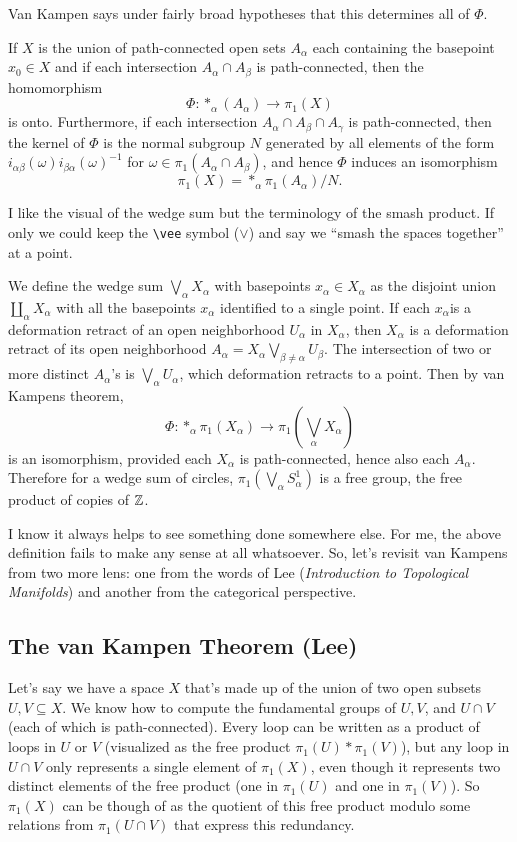 Van Kampen says under fairly broad hypotheses that this determines all of $\Phi$.

\begin{theorem}
    If $X$ is the union of path-connected open sets $A_{\alpha}$ each containing the basepoint $x_0\in X$ and if each intersection $A_{\alpha}\cap A_{\beta}$ is path-connected, then the homomorphism \[
        \Phi \colon *_{\alpha}(A_{\alpha}) \to \pi_1(X)
    \] is onto. Furthermore, if each intersection $A_{\alpha}\cap A_{\beta}\cap A_{\gamma}$ is path-connected, then the kernel of $\Phi$ is the normal subgroup $N$ generated by all elements of the form $i_{\alpha\beta}(\omega)i_{\beta\alpha}(\omega)^{-1}$ for $\omega \in \pi_1(A_{\alpha}\cap A_{\beta})$, and hence $\Phi$ induces an isomorphism \[
    \pi_1(X)=*_{\alpha}\pi_1(A_{\alpha}) /N.
    \] 
\end{theorem}
\begin{example}
    I like the visual of the wedge sum but the terminology of the smash product. If only we could keep the \texttt{\textbackslash vee} symbol ($\vee$) and say we ``smash the spaces together'' at a point. 

    We define the wedge sum $\bigvee_{\alpha}X_{\alpha}$ with basepoints $x_{\alpha}\in X_{\alpha}$ as the disjoint union $\amalg_{\alpha}X_{\alpha}$ with all the basepoints $x_{\alpha}$ identified to a single point. If each $x_{\alpha}$is a deformation retract of an open neighborhood $U_{\alpha }$ in $X_{\alpha }$, then $X_{\alpha }$ is a deformation retract of its open neighborhood $A_{\alpha }=X_{\alpha }\bigvee_{\beta\neq\alpha }U_{\beta}$. The intersection of two or more distinct $A_{\alpha }$'s is $\bigvee_{\alpha }U_{\alpha }$, which deformation retracts to a point. Then by van Kampens theorem, \[
        \Phi \colon *_{\alpha }\pi_1(X_{\alpha }) \to \pi_1(\bigvee_{\alpha }X_{\alpha })
    \] is an isomorphism, provided each $X_{\alpha }$ is path-connected, hence also each $A_{\alpha }$. Therefore for a wedge sum of circles, $\pi_1(\bigvee_{\alpha }S_{\alpha }^{1})$ is a free group, the free product of copies of $\mathbb{Z}$.
\end{example}
\orbreak
I know it always helps to see something done somewhere else. For me, the above definition fails to make any sense at all whatsoever. So, let's revisit van Kampens from two more lens: one from the words of Lee (\emph{Introduction to Topological Manifolds}) and another from the categorical perspective.
\subsection{The van Kampen Theorem (Lee)}
Let's say we have a space $X$ that's made up of the union of two open subsets $U,V\subseteq X$. We know how to compute the fundamental groups of $U,V$, and $U\cap V$ (each of which is path-connected). Every loop can be written as a product of loops in $U$ or $V$ (visualized as the free product $\pi_1(U)*\pi_1(V)$), but any loop in $U\cap V$ only represents a single element of $\pi_1(X)$, even though it represents two distinct elements of the free product (one in $\pi_1(U)$ and one in $\pi_1(V)$). So $\pi_1(X)$ can be though of as the quotient of this free product modulo some relations from $\pi_1(U\cap V)$ that express this redundancy.

